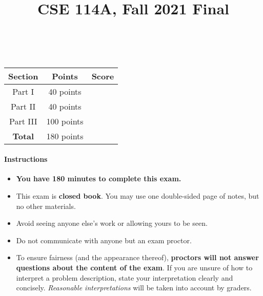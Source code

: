 \documentclass[paper=letter, fontsize=13pt]{article} %
\title{\vspace{-2em} 	
\normalfont \normalsize 
{\huge CSE 114A, Fall 2021 Final} \\ %
\horrule{2pt} \\[0.5cm] %
}
\date{\vspace{-4em}} %
\numberwithin{equation}{section} %
\begin{document}
\maketitle %


\begin{center}
 {\Large
\begin{tabular}{|c|c|c|}
\hline
\textbf{Section} & \textbf{Points} & \textbf{Score} \\
\hline
Part I     & 40 points  & \\
\hline
Part II   &  40 points &   \\
\hline
Part III   &  100 points &   \\
\hline
 \textbf{Total} & 180 points &   \\
\hline
\end{tabular}
}

\end{center}
\large 


\paragraph{\textbf{ Instructions} }
\begin{itemize}

\item \textbf{You have 180 minutes to complete this exam.}

\item This exam is \textbf{closed book}.  You may use one double-sided
page of notes, but no other materials.

\item Avoid seeing anyone else's work or allowing yours to be seen.

\item Do not communicate with anyone but an exam proctor.

\item To ensure fairness (and the appearance thereof),
  \textbf{proctors will not answer questions about the content of the exam}. If you are unsure 
  of how to interpret a problem description, state your interpretation clearly and concisely. 
  \textit{Reasonable interpretations} will be taken into account by graders.

\end{itemize}
\end{document}
